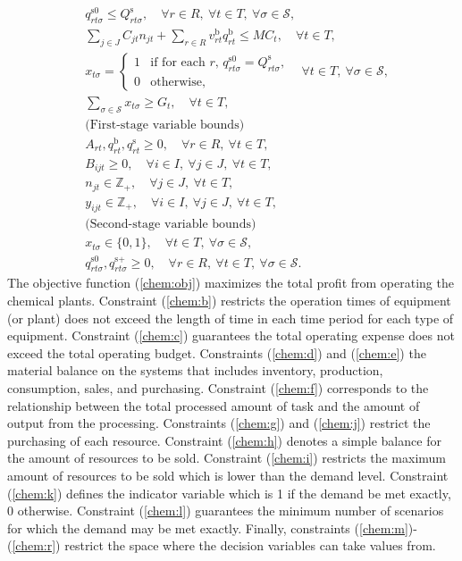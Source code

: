 \begin{subequations}
\begin{align}
	&q_{rt\sigma}^\textrm{s0}\le Q_{rt\sigma}^\textrm{s},\quad\forall r\in R,\ \forall t\in T,\ \forall \sigma\in\mathcal{S},\label{chem:h}\\
	&\sum_{j\in J}C_{jt}n_{jt}+\sum_{r\in R}v_{rt}^\textrm{b}q_{rt}^\textrm{b}\le MC_t,\quad\forall t\in T,\label{chem:j}\\
	&x_{t\sigma}=\left\{ 
				\begin{array}{ll}
					1& \textrm{if for each $r$, $q_{rt\sigma}^\textrm{s0}=Q_{rt\sigma}^\textrm{s}$,}\\ 
					0& \textrm{otherwise,}
				\end{array}	
			\right. \quad\forall t\in T,\ \forall \sigma\in\mathcal{S}, \label{chem:k}\\
	&\sum_{\sigma\in\mathcal{S}}x_{t\sigma}\ge G_t,\quad\forall t\in T,\label{chem:l}\\
	&\textrm{(First-stage variable bounds)} \nonumber\\	
	&A_{rt},q_{rt}^\textrm{b},q_{rt}^\textrm{s}\ge 0,\quad\forall r\in R,\ \forall t\in T,\label{chem:m}\\
	&B_{ijt}\ge 0,\quad\forall i\in I,\ \forall j\in J,\ \forall t\in T,\label{chem:n}\\
	&n_{jt}\in\mathbb{Z}_+,\quad\forall j\in J,\ \forall t\in T,\label{chem:o}\\
	&y_{ijt}\in\mathbb{Z}_+,\quad\forall i\in I,\ \forall j\in J,\ \forall t\in T,\label{chem:p}\\
	&\textrm{(Second-stage variable bounds)} \nonumber\\	
	&x_{t\sigma}\in \{0,1\},\quad \forall t\in T,\ \forall\sigma\in\mathcal{S},\label{chem:q}\\
	&q_{rt\sigma}^\textrm{s0},q_{rt\sigma}^\textrm{s+}\ge 0,\quad\forall r\in R,\ \forall t\in T,\ \forall \sigma\in\mathcal{S}.\label{chem:r}
	\end{align}
\end{subequations}
The objective function (\ref{chem:obj}) maximizes the total profit from operating the chemical plants. Constraint (\ref{chem:b}) restricts the operation times of equipment (or plant) does not exceed the length of time in each time period for each type of equipment. Constraint (\ref{chem:c}) guarantees the total operating expense does not exceed the total operating budget. Constraints (\ref{chem:d}) and (\ref{chem:e}) the material balance on the systems that includes inventory, production, consumption, sales, and purchasing. Constraint (\ref{chem:f}) corresponds to the relationship between the total processed amount of task and the amount of output from the processing. Constraints (\ref{chem:g}) and (\ref{chem:j}) restrict the purchasing of each resource. Constraint (\ref{chem:h}) denotes a simple balance for the amount of resources to be sold. Constraint (\ref{chem:i}) restricts the maximum amount of resources to be sold which is lower than the demand level. Constraint (\ref{chem:k}) defines the indicator variable which is 1 if the demand be met exactly, 0 otherwise. Constraint (\ref{chem:l}) guarantees the minimum number of scenarios for which the demand may be met exactly. Finally, constraints (\ref{chem:m})-(\ref{chem:r}) restrict the space where the decision variables can take values from.
